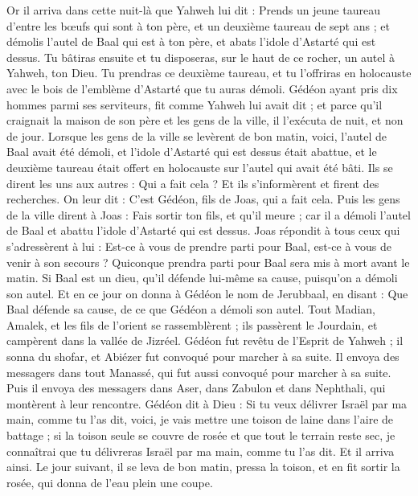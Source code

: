 \begin{multicols}{2}
Or il arriva dans cette nuit-là que Yahweh lui dit : Prends un jeune taureau d'entre les bœufs qui sont à ton père, et un deuxième taureau de sept ans ; et démolis l'autel de Baal qui est à ton père, et abats l’idole d'Astarté qui est dessus.
Tu bâtiras ensuite et tu disposeras, sur le haut de ce rocher, un autel à Yahweh, ton Dieu. Tu prendras ce deuxième taureau, et tu l'offriras en holocauste avec le bois de l’emblème d’Astarté que tu auras démoli.
Gédéon ayant pris dix hommes parmi ses serviteurs, fit comme Yahweh lui avait dit ; et parce qu'il craignait la maison de son père et les gens de la ville, il l’exécuta de nuit, et non de jour.
Lorsque les gens de la ville se levèrent de bon matin, voici, l'autel de Baal avait été démoli, et l'idole d'Astarté qui est dessus était abattue, et le deuxième taureau était offert en holocauste sur l'autel qui avait été bâti.
Ils se dirent les uns aux autres : Qui a fait cela ? Et ils s’informèrent et firent des recherches. On leur dit : C’est Gédéon, fils de Joas, qui a fait cela.
Puis les gens de la ville dirent à Joas : Fais sortir ton fils, et qu'il meure ; car il a démoli l'autel de Baal et abattu l'idole d'Astarté qui est dessus.
Joas répondit à tous ceux qui s'adressèrent à lui : Est-ce à vous de prendre parti pour Baal, est-ce à vous de venir à son secours ? Quiconque prendra parti pour Baal sera mis à mort avant le matin. Si Baal est un dieu, qu'il défende lui-même sa cause, puisqu'on a démoli son autel.
Et en ce jour on donna à Gédéon le nom de Jerubbaal, en disant : Que Baal défende sa cause, de ce que Gédéon a démoli son autel.
Tout Madian, Amalek, et les fils de l’orient se rassemblèrent ;  ils passèrent le Jourdain, et campèrent dans la vallée de Jizréel.
Gédéon fut revêtu de l'Esprit de Yahweh ; il sonna du shofar, et Abiézer fut convoqué pour marcher à sa suite.
Il envoya des messagers dans tout Manassé, qui fut aussi convoqué pour marcher à sa suite. Puis il envoya des messagers dans Aser, dans Zabulon et dans Nephthali, qui montèrent à leur rencontre.
Gédéon dit à Dieu : Si tu veux délivrer Israël par ma main, comme tu l'as dit,
voici, je vais mettre une toison de laine dans l'aire de battage ; si la toison seule se couvre de rosée et que tout le terrain reste sec, je connaîtrai que tu délivreras Israël par ma main, comme tu l’as dit.
Et il arriva ainsi. Le jour suivant, il se leva de bon matin, pressa la toison, et en fit sortir la rosée, qui donna de l’eau plein une coupe.

\end{multicols}

